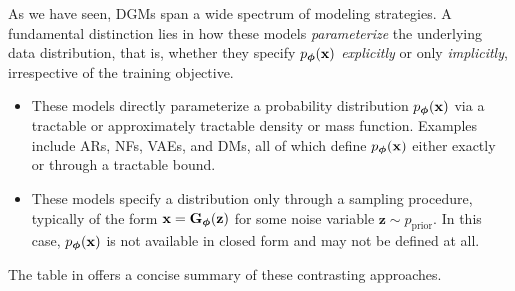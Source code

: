 As we have seen, DGMs span a wide spectrum of modeling strategies. A fundamental distinction lies in how these models \emph{parameterize} the underlying data distribution, that is, whether they specify $p_{\bm{\phi}}(\mathbf{x})$ \emph{explicitly} or only \emph{implicitly}, irrespective of the training objective.

\begin{itemize}
  \item {}  
  These models directly parameterize a probability distribution $p_{\bm{\phi}}(\mathbf{x})$ via a tractable or approximately tractable density or mass function. Examples include ARs, NFs, VAEs, and DMs, all of which define $p_{\bm{\phi}}(\mathbf{x})$ either exactly or through a tractable bound.

  \item {}  
  These models specify a distribution only through a sampling procedure, typically of the form $\mathbf{x} = {\mathbf{G}}_{\bm{\phi}}(\mathbf{z})$ for some noise variable $\mathbf{z} \sim p_{\mathrm{prior}}$. In this case, $p_{\bm{\phi}}(\mathbf{x})$ is not available in closed form and may not be defined at all.
\end{itemize}


The table in  offers a concise summary of these contrasting approaches.


\begin{table}[th]
  \caption{Comparison of Explicit and Implicit Generative Models}
  \small
  \centering
  \label{tb:comparison-explicit-implicit}
\end{table}


